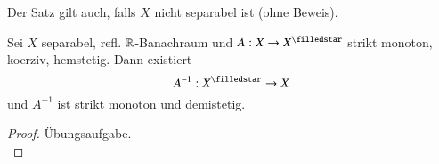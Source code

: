 \begin{remark}
    Der Satz gilt auch, falls $X$ nicht separabel ist (ohne Beweis).
\end{remark}

\begin{cor}\label{4.7}
    Sei $X$ separabel, refl. $\mathbb{R}$-Banachraum und $A:X\ra X^\star$ strikt monoton, koerziv, hemstetig.
    Dann existiert
    \[
        A^{-1}:X^\star\ra X
    \]
    und $A^{-1}$ ist strikt monoton und demistetig.
\end{cor}

\begin{proof}
    Übungsaufgabe. \[ \]
\end{proof}
